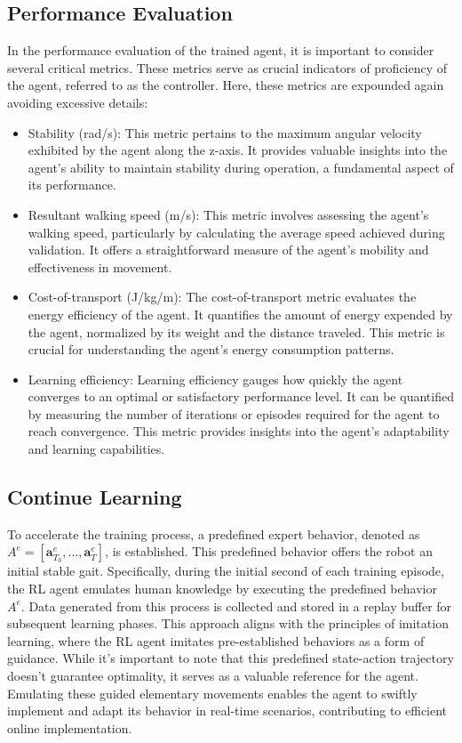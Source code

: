 \subsection{Performance Evaluation}
In the performance evaluation of the trained agent, it is important to consider several critical metrics. These metrics serve as crucial indicators of proficiency of the agent, referred to as the controller. Here, these metrics are expounded again avoiding excessive details:
\begin{itemize}
    \item Stability (rad/s): This metric pertains to the maximum angular velocity exhibited by the agent along the z-axis. It provides valuable insights into the agent's ability to maintain stability during operation, a fundamental aspect of its performance. 
    \item Resultant walking speed (m/s): This metric involves assessing the agent's walking speed, particularly by calculating the average speed achieved during validation. It offers a straightforward measure of the agent's mobility and effectiveness in movement.
    \item Cost-of-transport (J/kg/m):  The cost-of-transport metric evaluates the energy efficiency of the agent. It quantifies the amount of energy expended by the agent, normalized by its weight and the distance traveled. This metric is crucial for understanding the agent's energy consumption patterns.
    \item Learning efficiency:  Learning efficiency gauges how quickly the agent converges to an optimal or satisfactory performance level. It can be quantified by measuring the number of iterations or episodes required for the agent to reach convergence. This metric provides insights into the agent's adaptability and learning capabilities.
\end{itemize}

\subsection{Continue Learning}
To accelerate the training process, a predefined expert behavior, denoted as $A^e = [\textbf{a}_{T_0}^e, ..., \textbf{a}_T^e]$, is established. This predefined behavior offers the robot an initial stable gait. Specifically, during the initial second of each training episode, the RL agent emulates human knowledge by executing the predefined behavior $A^e$. Data generated from this process is collected and stored in a replay buffer for subsequent learning phases. This approach aligns with the principles of imitation learning, where the RL agent imitates pre-established behaviors as a form of guidance. While it's important to note that this predefined state-action trajectory doesn't guarantee optimality, it serves as a valuable reference for the agent. Emulating these guided elementary movements enables the agent to swiftly implement and adapt its behavior in real-time scenarios, contributing to efficient online implementation.


